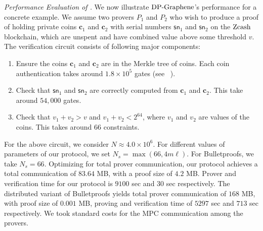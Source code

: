 {\em Performance Evaluation of \dpname.}
We now illustrate $\text{DP-Graphene}$'s performance for a concrete example. We assume two
provers $P_1$ and $P_2$ who wish to produce a proof of holding private coins
$\bm{c}_1$ and $\bm{c}_2$ with serial
numbers $\mathsf{sn}_1$ and $\mathsf{sn}_2$ on the $\mathrm{Zcash}$ blockchain, which
are unspent and have combined value above some threshold $v$. The verification
circuit consists of following major components:
\begin{enumerate}
\item Ensure the coins $\bm{c}_1$ and $\bm{c}_2$ are in the Merkle tree of
coins. Each coin authentication takes around $1.8\times 10^5$ gates (see
~\cite[Section 5.2.2]{zerocashext}).
\item Check that $\mathsf{sn}_1$ and $\mathsf{sn}_2$ are correctly computed from 
$\bm{c}_1$ and $\bm{c}_2$. This take around $54,000$ gates.
\item Check that $v_1+v_2>v$ and $v_1+v_2 < 2^{64}$, where $v_1$ and $v_2$ are
values of the coins. This takes around 66 constraints.
\end{enumerate}
For the above circuit, we consider $N\approx 4.0\times 10^6$. For different
values of parameters of our protocol, we set $N_s=\max(66,4m\ell)$.
For Bulletproofs, we take $N_s=66$. Optimizing for total prover communication, our
protocol achieves a total communication of $83.64$ MB, with a proof size of
$4.2$ MB. Prover and verification time for our protocol is  $9100$ sec and $30$ sec
respectively. The distributed variant of Bulletproofs yields total prover
communication of $168$ MB, with proof size of $0.001$ MB, proving and
verification time of $5297$ sec and $713$ sec respectively. We took standard
costs for the MPC communication among the provers. 

